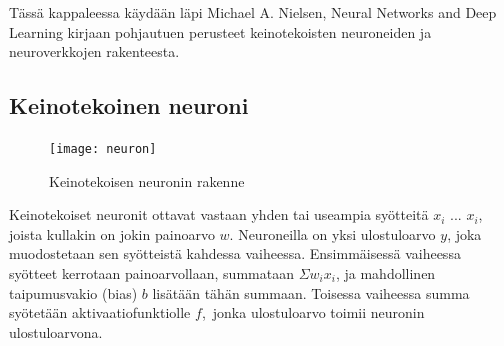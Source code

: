 \documentclass[finnish]{tktltiki2}
\theoremstyle{definition}
\theoremstyle{remark}
\begin{document}
  Tässä kappaleessa käydään läpi Michael A. Nielsen, Neural Networks and Deep Learning \cite{Nielsen-neural} kirjaan pohjautuen perusteet keinotekoisten neuroneiden ja neuroverkkojen rakenteesta. 

  \subsection{Keinotekoinen neuroni}
    \label{chap:artificial-neuron}

    \begin{figure}[h]
      \centering
      \texttt{[image: neuron]}
      \caption{Keinotekoisen neuronin rakenne}
      \label{pic:neuron}
    \end{figure}

    Keinotekoiset neuronit ottavat vastaan yhden tai useampia syötteitä $x_i$ ... $x_i$, joista kullakin on jokin painoarvo $w$. Neuroneilla on yksi ulostuloarvo $y$, joka muodostetaan sen syötteistä kahdessa vaiheessa.
    Ensimmäisessä vaiheessa syötteet kerrotaan painoarvollaan, summataan $\Sigma w_i x_i$, ja mahdollinen taipumusvakio (bias) $b$ lisätään tähän summaan.
    Toisessa vaiheessa summa syötetään aktivaatiofunktiolle $f$, jonka ulostuloarvo toimii neuronin ulostuloarvona.

%
%
%
\end{document}
